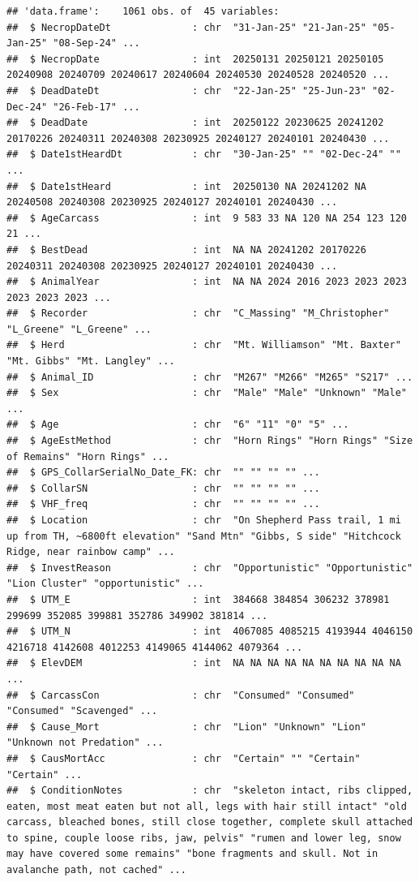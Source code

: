 \documentclass[
]{book}
\begin{document}
\begin{verbatim}
## 'data.frame':    1061 obs. of  45 variables:
##  $ NecropDateDt              : chr  "31-Jan-25" "21-Jan-25" "05-Jan-25" "08-Sep-24" ...
##  $ NecropDate                : int  20250131 20250121 20250105 20240908 20240709 20240617 20240604 20240530 20240528 20240520 ...
##  $ DeadDateDt                : chr  "22-Jan-25" "25-Jun-23" "02-Dec-24" "26-Feb-17" ...
##  $ DeadDate                  : int  20250122 20230625 20241202 20170226 20240311 20240308 20230925 20240127 20240101 20240430 ...
##  $ Date1stHeardDt            : chr  "30-Jan-25" "" "02-Dec-24" "" ...
##  $ Date1stHeard              : int  20250130 NA 20241202 NA 20240508 20240308 20230925 20240127 20240101 20240430 ...
##  $ AgeCarcass                : int  9 583 33 NA 120 NA 254 123 120 21 ...
##  $ BestDead                  : int  NA NA 20241202 20170226 20240311 20240308 20230925 20240127 20240101 20240430 ...
##  $ AnimalYear                : int  NA NA 2024 2016 2023 2023 2023 2023 2023 2023 ...
##  $ Recorder                  : chr  "C_Massing" "M_Christopher" "L_Greene" "L_Greene" ...
##  $ Herd                      : chr  "Mt. Williamson" "Mt. Baxter" "Mt. Gibbs" "Mt. Langley" ...
##  $ Animal_ID                 : chr  "M267" "M266" "M265" "S217" ...
##  $ Sex                       : chr  "Male" "Male" "Unknown" "Male" ...
##  $ Age                       : chr  "6" "11" "0" "5" ...
##  $ AgeEstMethod              : chr  "Horn Rings" "Horn Rings" "Size of Remains" "Horn Rings" ...
##  $ GPS_CollarSerialNo_Date_FK: chr  "" "" "" "" ...
##  $ CollarSN                  : chr  "" "" "" "" ...
##  $ VHF_freq                  : chr  "" "" "" "" ...
##  $ Location                  : chr  "On Shepherd Pass trail, 1 mi up from TH, ~6800ft elevation" "Sand Mtn" "Gibbs, S side" "Hitchcock Ridge, near rainbow camp" ...
##  $ InvestReason              : chr  "Opportunistic" "Opportunistic" "Lion Cluster" "opportunistic" ...
##  $ UTM_E                     : int  384668 384854 306232 378981 299699 352085 399881 352786 349902 381814 ...
##  $ UTM_N                     : int  4067085 4085215 4193944 4046150 4216718 4142608 4012253 4149065 4144062 4079364 ...
##  $ ElevDEM                   : int  NA NA NA NA NA NA NA NA NA NA ...
##  $ CarcassCon                : chr  "Consumed" "Consumed" "Consumed" "Scavenged" ...
##  $ Cause_Mort                : chr  "Lion" "Unknown" "Lion" "Unknown not Predation" ...
##  $ CausMortAcc               : chr  "Certain" "" "Certain" "Certain" ...
##  $ ConditionNotes            : chr  "skeleton intact, ribs clipped, eaten, most meat eaten but not all, legs with hair still intact" "old carcass, bleached bones, still close together, complete skull attached to spine, couple loose ribs, jaw, pelvis" "rumen and lower leg, snow may have covered some remains" "bone fragments and skull. Not in avalanche path, not cached" ...

\end{verbatim}
\end{document}
